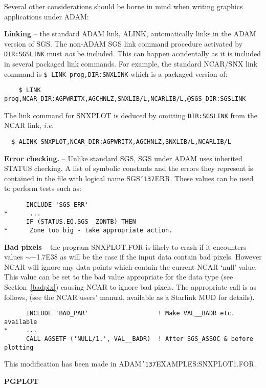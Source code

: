 \documentclass[twoside,11pt]{article}
\renewcommand{\_}{{\tt\char'137}}
\begin{document}
Several other considerations should be borne in mind when writing graphics
applications under ADAM:

{\bf Linking} -- the standard ADAM link, ALINK,
automatically links in the ADAM version of SGS.
The non-ADAM SGS link command procedure activated by {\tt \@SGS\_DIR:SGSLINK}
must {\sl not\/} be included.
This can happen accidentally as it is  included in several
packaged link commands.
For example, the standard NCAR/SNX link command is
{\tt  \$ LINK prog,\@NCAR\_DIR:SNXLINK}
which is a packaged version of:
\begin{verbatim}
    $ LINK prog,NCAR_DIR:AGPWRITX,AGCHNLZ,SNXLIB/L,NCARLIB/L,@SGS_DIR:SGSLINK
\end{verbatim}
\newpage
The link command for SNXPLOT is deduced by
omitting {\tt \@SGS\_DIR:SGSLINK} from the NCAR link, {\it i.e.}
\begin{verbatim}
  $ ALINK SNXPLOT,NCAR_DIR:AGPWRITX,AGCHNLZ,SNXLIB/L,NCARLIB/L
\end{verbatim}
{\bf Error checking.} -- Unlike standard SGS, SGS under ADAM
uses inherited STATUS checking.
A list of symbolic constants and the errors they represent is contained in
the file with logical name SGS\_ERR.
These values can be used to perform tests such as:
\begin{verbatim}
      INCLUDE 'SGS_ERR'
*      ...
      IF (STATUS.EQ.SGS__ZONTB) THEN
*      Zone too big - take appropriate action.
\end{verbatim}
{\bf Bad pixels} -- the program SNXPLOT.FOR is likely to
crash if it encounters values $\sim-$1.7E38
as will be the case if the input data contain bad pixels.
However NCAR will ignore any data points which contain the current
NCAR `null' value.
This value can be set to the bad value appropriate for the data type
(see Section~\ref{badpix}) causing NCAR to ignore bad pixels.
The appropriate call is as follows, (see the NCAR users' manual,
available as a Starlink MUD for details).
\begin{verbatim}
      INCLUDE 'BAD_PAR'                   ! Make VAL__BADR etc. available
*     ...
      CALL AGSETF ('NULL/1.', VAL__BADR)  ! After SGS_ASSOC & before plotting
\end{verbatim}
This modification has been made in ADAM\_EXAMPLES:SNXPLOT1.FOR.


{\bigskip\large\bf PGPLOT}
\end{document}
